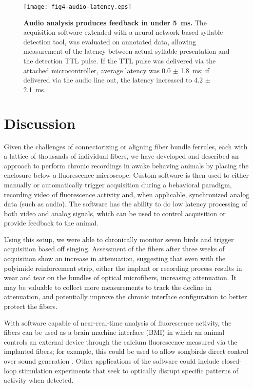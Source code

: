 \begin{figure}
\texttt{[image: fig4-audio-latency.eps]}
\caption[Latency for audio processing]{\textbf{Audio analysis 
produces feedback in under 5~ms.} The acquisition 
software extended with a neural network based syllable detection 
tool, was evaluated on annotated data, allowing measurement of the 
latency between actual syllable presentation and the detection 
TTL pulse. If the TTL pulse was delivered via the attached 
microcontroller, average latency was 0.0 $\pm$ 1.8~ms; if 
delivered via the audio line out, the latency increased to 
4.2 $\pm$ 2.1~ms.}
\label{fig:audio-latency}
\end{figure}

\section{Discussion}

Given the challenges of connectorizing or aligning fiber 
bundle ferrules, each with a lattice of thousands of individual 
fibers, we have developed and described an approach to 
perform chronic recordings in awake behaving animals by 
placing the enclosure below a fluorescence microscope. 
Custom software is then used to either manually or 
automatically trigger acquisition during a behavioral 
paradigm, recording video of fluorescence activity and, 
when applicable, synchronized analog data (such as audio).
The software has the ability to do low latency processing 
of both video and analog signals, which can be used to 
control acquisition or provide feedback to the animal.

Using this setup, we were able to chronically monitor 
seven birds and trigger acquisition based off singing. 
Assessment of the fibers after three weeks of acquisition 
show an increase in attenuation, suggesting that even 
with the polyimide reinforcement strip, either the implant 
or recording process results in wear and tear on the 
bundles of optical microfibers, increasing attenuation. 
It may be valuable to collect more measurements to track 
the decline in attenuation, and potentially improve 
the chronic interface configuration to better protect 
the fibers.

With software capable of near-real-time analysis of
fluorescence activity, the fibers can be used as a 
brain machine interface (BMI) in which an animal controls 
an external device through the calcium fluorescence 
measured via the implanted fibers; for example, this could 
be used to allow songbirds direct control over sound 
generation \cite{Clancy:2014gw}. Other applications 
of the software could include closed-loop stimulation experiments 
that seek to optically disrupt specific patterns of 
activity when detected.

